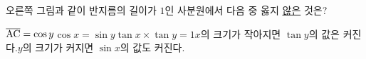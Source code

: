 \noindent\begin{minipage}[t]{0.58\linewidth}\vspace{0pt}\raggedright 오른쪽 그림과 같이 반지름의 길이가 $1$인 사분원에서 다음 중 옳지 \underline{않은} 것은? \end{minipage}\hfill\begin{minipage}[t]{0.4\linewidth}\vspace{0pt}\centering \resizebox{\ifdim\width>\linewidth\linewidth\else\width\fi}{!}{}\end{minipage}\par
\begin{choicesv}{$\overline{\mathrm{AC}}=\cos y$}{$\cos x=\sin y$}{$\tan x\times\tan y=1$}{$x$의 크기가 작아지면 $\tan y$의 값은 커진다.}{$y$의 크기가 커지면 $\sin x$의 값도 커진다.}\end{choicesv}
